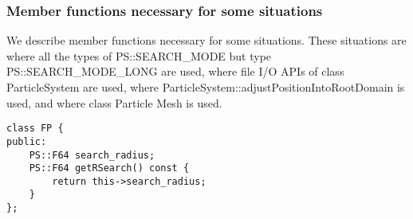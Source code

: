 \subsubsection{Member functions necessary for some situations}



We describe member functions necessary for some situations. These
situations are where all the types of PS::SEARCH\_MODE but type
PS::SEARCH\_MODE\_LONG are used, where file I/O APIs of class
ParticleSystem are used, where
ParticleSystem::adjustPositionIntoRootDomain is used, and where class
Particle Mesh is used.



\begin{screen}
\begin{verbatim}
class FP {
public:
    PS::F64 search_radius;
    PS::F64 getRSearch() const {
        return this->search_radius;
    }
};
\end{verbatim}
\end{screen}


